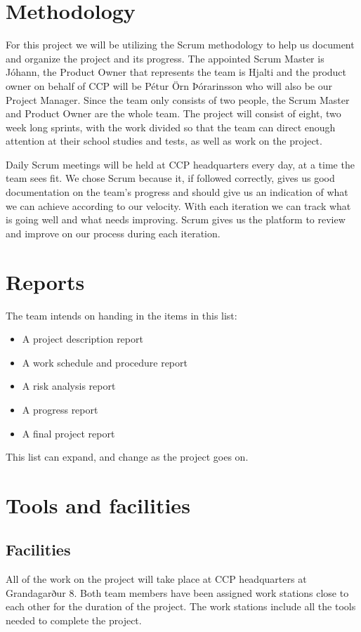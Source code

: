 \documentclass[11pt]{article}
\begin{document}
\section*{Methodology}
For this project we will be utilizing the Scrum methodology to help us document and organize the project and its progress. The appointed Scrum Master is Jóhann, the Product Owner that represents the team is Hjalti and the product owner on behalf of CCP will be Pétur Örn Þórarinsson who will also be our Project Manager. Since the team only consists of two people, the Scrum Master and Product Owner are the whole team. The project will consist of eight, two week long sprints, with the work divided so that the team can direct enough attention at their school studies and tests, as well as work on the project.

Daily Scrum meetings will be held at CCP headquarters every day, at a time the team sees fit. We chose Scrum because it, if followed correctly, gives us good documentation on the team's progress and should give us an indication of what we can achieve according to our velocity. With each iteration we can track what is going well and what needs improving. Scrum gives us the platform to review and improve on our process during each iteration.

\section*{Reports}
The team intends on handing in the items in this list:
\begin{itemize}
  \item A project description report
  \item A work schedule and procedure report
  \item A risk analysis report
  \item A progress report
  \item A final project report
\end{itemize}

\noindent This list can expand, and change as the project goes on.

\section*{Tools and facilities}

\subsection*{Facilities}
All of the work on the project will take place at CCP headquarters at Grandagarður 8. Both team members have been assigned work stations close to each other for the duration of the project. The work stations include all the tools needed to complete the project. 
\end{document}
